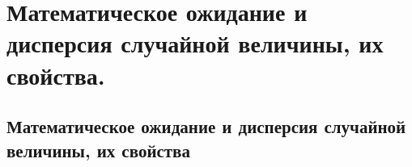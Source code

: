 \chapter{Математическое ожидание и дисперсия случайной величины, их свойства.}
\section{Математическое ожидание и дисперсия случайной величины, их свойства}